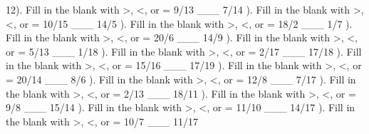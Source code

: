 \documentclass{article}%
\begin{document}
12). Fill in the blank with >, <, or = 9/13 \_\_\_ 7/14%
\newline%
\newline%
). Fill in the blank with >, <, or = 10/15 \_\_\_ 14/5%
\newline%
\newline%
). Fill in the blank with >, <, or = 18/2 \_\_\_ 1/7%
\newline%
\newline%
). Fill in the blank with >, <, or = 20/6 \_\_\_ 14/9%
\newline%
\newline%
). Fill in the blank with >, <, or = 5/13 \_\_\_ 1/18%
\newline%
\newline%
). Fill in the blank with >, <, or = 2/17 \_\_\_ 17/18%
\newline%
\newline%
). Fill in the blank with >, <, or = 15/16 \_\_\_ 17/19%
\newline%
\newline%
). Fill in the blank with >, <, or = 20/14 \_\_\_ 8/6%
\newline%
\newline%
). Fill in the blank with >, <, or = 12/8 \_\_\_ 7/17%
\newline%
\newline%
). Fill in the blank with >, <, or = 2/13 \_\_\_ 18/11%
\newline%
\newline%
). Fill in the blank with >, <, or = 9/8 \_\_\_ 15/14%
\newline%
\newline%
). Fill in the blank with >, <, or = 11/10 \_\_\_ 14/17%
\newline%
\newline%
). Fill in the blank with >, <, or = 10/7 \_\_\_ 11/17%
\newline%
\newline%
\end{document}
